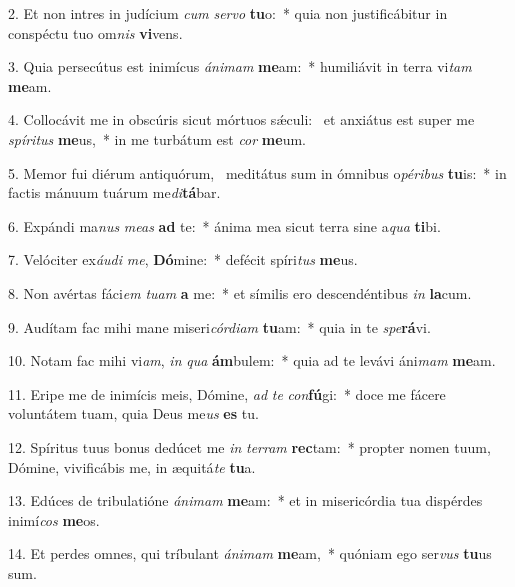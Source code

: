 2. Et non intres in judícium \textit{cum} \textit{ser}\textit{vo} \textbf{tu}o:~*  quia non justificábitur in conspéctu tuo om\textit{nis} \textbf{vi}vens.\

3. Quia persecútus est inimícus \textit{á}\textit{ni}\textit{mam} \textbf{me}am:~*  humiliávit in terra vi\textit{tam} \textbf{me}am.\

4. Collocávit me in obscúris sicut mórtuos sǽculi: \dag\  et anxiátus est super me \textit{spí}\textit{ri}\textit{tus} \textbf{me}us,~*  in me turbátum est \textit{cor} \textbf{me}um.\

5. Memor fui diérum antiquórum, \dag\  meditátus sum in ómnibus o\textit{pé}\textit{ri}\textit{bus} \textbf{tu}is:~*  in factis mánuum tuárum me\textit{di}\textbf{tá}bar.\

6. Expándi ma\textit{nus} \textit{me}\textit{as} \textbf{ad} te:~*  ánima mea sicut terra sine a\textit{qua} \textbf{ti}bi.\

7. Velóciter ex\textit{áu}\textit{di} \textit{me}, \textbf{Dó}mine:~*  defécit spíri\textit{tus} \textbf{me}us.\

8. Non avértas fáci\textit{em} \textit{tu}\textit{am} \textbf{a} me:~*  et símilis ero descendéntibus \textit{in} \textbf{la}cum.\

9. Audítam fac mihi mane miseri\textit{cór}\textit{di}\textit{am} \textbf{tu}am:~*  quia in te \textit{spe}\textbf{rá}vi.\

10. Notam fac mihi vi\textit{am}, \textit{in} \textit{qua} \textbf{ám}bulem:~*  quia ad te levávi áni\textit{mam} \textbf{me}am.\

11. Eripe me de inimícis meis, Dómine, \textit{ad} \textit{te} \textit{con}\textbf{fú}gi:~*  doce me fácere voluntátem tuam, quia Deus me\textit{us} \textbf{es} tu.\

12. Spíritus tuus bonus dedúcet me \textit{in} \textit{ter}\textit{ram} \textbf{rec}tam:~*  propter nomen tuum, Dómine, vivificábis me, in æquitá\textit{te} \textbf{tu}a.\

13. Edúces de tribulatióne \textit{á}\textit{ni}\textit{mam} \textbf{me}am:~*  et in misericórdia tua dispérdes inimí\textit{cos} \textbf{me}os.\

14. Et perdes omnes, qui tríbulant \textit{á}\textit{ni}\textit{mam} \textbf{me}am,~*  quóniam ego ser\textit{vus} \textbf{tu}us sum.\

